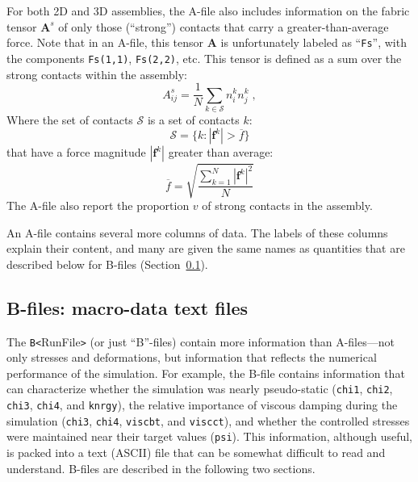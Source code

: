 \documentclass[letterpaper,11pt]{article}
\begin{document}
\par
For both 2D and 3D assemblies, the A-file also includes information
on the fabric tensor $\mathbf{A}^{s}$ of only those (``strong'') contacts that
carry a greater-than-average force.
Note that in an A-file, this tensor
$\mathbf{A}$ is unfortunately labeled as ``\texttt{Fs}'', with the components
\texttt{Fs(1,1)}, \texttt{Fs(2,2)}, etc.
This tensor is defined as a sum over the strong contacts within
the assembly:
\begin{equation}\label{eq:fabric2}
A_{ij}^{s} = \frac{1}{N}
\sum_{k\in \mathcal{S}}
n_{i}^{k} n_{j}^{k}\;,
\end{equation}
Where the set of contacts $\mathcal{S}$ is a set of contacts $k$:
\begin{equation}
\mathcal{S} = \{k: |\mathbf{f}^{k}| > \overline{f} \}
\end{equation}
that have a force magnitude $|\mathbf{f}^{k}|$ greater than average:
\begin{equation}
\overline{f} = \sqrt{
\frac{\sum_{k=1}^{N} |\mathbf{f}^{k}|^{2}} {N}
                    }
\end{equation}
The A-file also report the proportion $v$ of strong contacts in the assembly.
\par
An A-file contains several more columns of data.  The labels of these
columns explain their content, and many are given the same names as
quantities that are described below for B-files (Section~\ref{sec:Bfiles}).
%
\subsection{B-files: macro-data text files}\label{sec:Bfiles}
The \texttt{B<}\textsf{RunFile}\texttt{>} (or just ``B''-files)
contain more information than A-files---not only 
stresses and deformations, but information
that reflects the numerical performance of the simulation.
For example, the B-file contains information that can characterize
whether the simulation was nearly pseudo-static
(\texttt{chi1}, \texttt{chi2}, \texttt{chi3}, \texttt{chi4}, and
\texttt{knrgy}), 
the relative importance
of viscous damping during the simulation
(\texttt{chi3}, \texttt{chi4}, \texttt{viscbt}, and \texttt{viscct}),
and whether the controlled stresses
were maintained near their target values (\texttt{psi}).
This information, although useful, is packed into a text (ASCII) file
that can be somewhat difficult to read and understand.
B-files are described in the following two sections.
%
\end{document}
